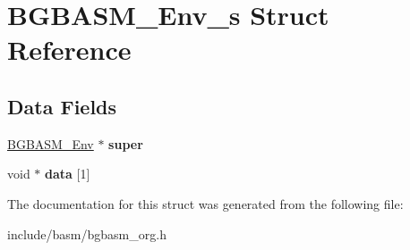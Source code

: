 \hypertarget{structBGBASM__Env__s}{\section{B\-G\-B\-A\-S\-M\-\_\-\-Env\-\_\-s Struct Reference}
\label{structBGBASM__Env__s}
}
\subsection*{Data Fields}
\begin{DoxyCompactItemize}
\item 
\hypertarget{structBGBASM__Env__s_a75297174e0ef7193a792cea8dc189ae2}{\hyperlink{structBGBASM__Env__s}{B\-G\-B\-A\-S\-M\-\_\-\-Env} $\ast$ {\bfseries super}}\label{structBGBASM__Env__s_a75297174e0ef7193a792cea8dc189ae2}

\item 
\hypertarget{structBGBASM__Env__s_ae667090491546e9a99a5994d02f542a9}{void $\ast$ {\bfseries data} \mbox{[}1\mbox{]}}\label{structBGBASM__Env__s_ae667090491546e9a99a5994d02f542a9}

\end{DoxyCompactItemize}


The documentation for this struct was generated from the following file\-:\begin{DoxyCompactItemize}
\item 
include/basm/bgbasm\-\_\-org.\-h\end{DoxyCompactItemize}
